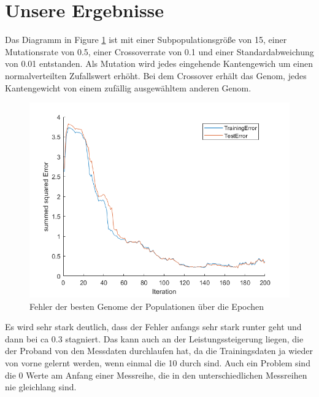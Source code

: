 \documentclass{hbrs-ecta-report}
\begin{document}
\section{Unsere Ergebnisse}

Das Diagramm in Figure \ref{fig:Error} ist mit einer Subpopulationsgröße von 15, einer Mutationsrate von 0.5, einer Crossoverrate von 0.1 und einer Standardabweichung von 0.01 entstanden.
Als Mutation wird jedes eingehende Kantengewich um einen normalverteilten Zufallswert erhöht. 
Bei dem Crossover erhält das Genom, jedes Kantengewicht von einem zufällig ausgewähltem anderen Genom.

\begin{figure}[h!]
	\includegraphics[width=\linewidth]{img/TrainingTestError}
	\caption{Fehler der besten Genome der Populationen über die Epochen}
	\label{fig:Error}
\end{figure}
\FloatBarrier

Es wird sehr stark deutlich, dass der Fehler anfangs sehr stark runter geht und dann bei ca 0.3 stagniert. Das kann auch an der Leistungssteigerung liegen, die der Proband von den Messdaten durchlaufen hat, da die Trainingsdaten ja wieder von vorne gelernt werden, wenn einmal die 10 durch sind. Auch ein Problem sind die 0 Werte am Anfang einer Messreihe, die in den unterschiedlichen Messreihen nie gleichlang sind. 
\end{document}
